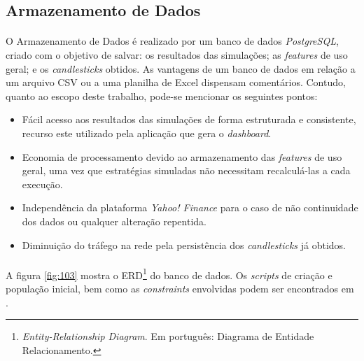 \FloatBarrier
\subsection{Armazenamento de Dados}

\paragraph{} O Armazenamento de Dados é realizado por um banco de dados \textit{PostgreSQL}, criado com o objetivo de salvar: os resultados das simulações; as \textit{features} de uso geral; e os \textit{candlesticks} obtidos. As vantagens de um banco de dados em relação a um arquivo CSV ou a uma planilha de Excel dispensam comentários. Contudo, quanto ao escopo deste trabalho, pode-se mencionar os seguintes pontos:

\begin{itemize}
    \item Fácil acesso aos resultados das simulações de forma estruturada e consistente, recurso este utilizado pela aplicação que gera o \textit{dashboard}.
    \item Economia de processamento devido ao armazenamento das \textit{features} de uso geral, uma vez que estratégias simuladas não necessitam recalculá-las a cada execução.
    \item Independência da plataforma \textit{Yahoo! Finance} para o caso de não continuidade dos dados ou qualquer alteração repentida.
    \item Diminuição do tráfego na rede pela persistência dos \textit{candlesticks} já obtidos.
\end{itemize}


\paragraph{} A figura \ref{fig:103} mostra o ERD\footnote{\textit{Entity-Relationship Diagram}. Em português: Diagrama de Entidade Relacionamento.} do banco de dados. Os \textit{scripts} de criação e população inicial, bem como as \textit{constraints} envolvidas podem ser encontrados em \cite{github_db_schema}.

